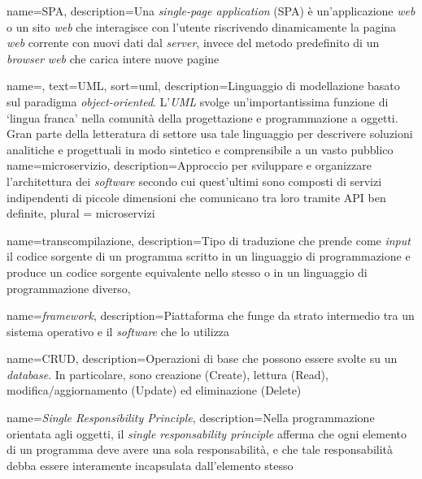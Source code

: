 {
    name=SPA,
    description={Una \textit{single-page application} (SPA) è un'applicazione
            \textit{web} o un sito \textit{web} che interagisce con l'utente
            riscrivendo
            dinamicamente la pagina \textit{web} corrente con nuovi dati dal
            \textit{server}, invece del metodo predefinito di un
            \textit{browser}
            \textit{web} che carica intere nuove pagine}
}

{
    name=,
    text=UML,
    sort=uml,
    description={Linguaggio di modellazione basato sul paradigma
            \textit{object-oriented}. L'\emph{UML} svolge un'importantissima
            funzione di
            \enquote*{lingua franca} nella comunità della progettazione e
            programmazione a
            oggetti. Gran parte della letteratura di settore usa tale
            linguaggio per
            descrivere soluzioni analitiche e progettuali in modo sintetico e
            comprensibile
            a un vasto pubblico}
}
{
    name={microservizio},
    description={Approccio per sviluppare e organizzare l'architettura dei
            \textit{software} secondo cui quest’ultimi sono composti di servizi
            indipendenti di piccole dimensioni che comunicano tra loro tramite
            \gls{API}
            ben definite},
    plural = {microservizi}
}

{
    name={transcompilazione},
    description={Tipo di traduzione
            che prende come \textit{input} il codice sorgente di un programma
            scritto
            in un linguaggio di programmazione e produce un codice sorgente
            equivalente
            nello stesso o in un linguaggio di programmazione diverso},
}

{
    name={\textit{framework}},
    description={Piattaforma che funge da strato intermedio tra un sistema
            operativo e il \textit{software} che lo utilizza}
}

{
    name={CRUD},
    description={Operazioni di base che possono essere svolte su un
            \textit{database}. In particolare,
            sono creazione (Create), lettura (Read), modifica/aggiornamento
            (Update) ed
            eliminazione (Delete)}
}

{
    name=\textit{Single Responsibility Principle},
    description={Nella programmazione orientata agli oggetti, il \textit{single
                responsability principle} afferma che ogni elemento di un
            programma deve avere
            una
            sola responsabilità, e che tale responsabilità debba essere
            interamente
            incapsulata dall'elemento stesso}
}

